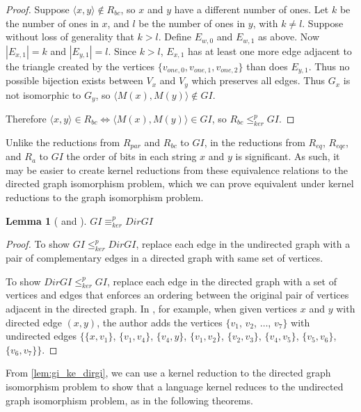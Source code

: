 \documentclass{article}
\newtheorem{lemma}[lemma]{Lemma}
\theoremstyle{definition} \newtheorem{definition}[definition]{Definition}
\newcommand{\kr}{\leq^{p}_{ker}} %
\newcommand{\kequiv}{\equiv^{p}_{ker}} %
\newcommand{\pair}[2]{\langle#1,#2\rangle} %
\begin{document}
\begin{proof}
  Suppose $\pair{x}{y}\notin R_{bc}$, so $x$ and $y$ have a different number of
  ones. Let $k$ be the number of ones in $x$, and $l$ be the number of ones in
  $y$, with $k\neq l$. Suppose without loss of generality that $k>l$. Define
  $E_{w,0}$ and $E_{w,1}$ as above. Now $|E_{x,1}|=k$ and $|E_{y,1}|=l$. Since
  $k>l$, $E_{x,1}$ has at least one more edge adjacent to the triangle created
  by the vertices $\{v_{one,0},v_{one,1},v_{one,2}\}$ than does $E_{y,1}$. Thus
  no possible bijection exists between $V_x$ and $V_y$ which preserves all
  edges. Thus $G_x$ is not isomorphic to $G_y$, so $\pair{M(x)}{M(y)}\notin
  GI$.

  Therefore $\pair{x}{y}\in R_{bc} \iff \pair{M(x)}{M(y)}\in GI$, so $R_{bc}\kr
  GI$.
\end{proof}

Unlike the reductions from $R_{par}$ and $R_{bc}$ to $GI$, in the reductions
from $R_{eq}$, $R_{eqc}$, and $R_a$ to $GI$ the order of bits in each string
$x$ and $y$ is significant. As such, it may be easier to create kernel
reductions from these equivalence relations to the directed graph isomorphism
problem, which we can prove equivalent under kernel reductions to the graph
isomorphism problem. 

\begin{lemma}[\cite{kst93} and \cite{miller77}]\label{lem:gi_ke_dirgi}
  $GI\kequiv DirGI$
\end{lemma}
\begin{proof}
  To show $GI\kr DirGI$, replace each edge in the undirected graph with a pair
  of complementary edges in a directed graph with same set of vertices.
  
  To show $DirGI\kr GI$, replace each edge in the directed graph with a set of
  vertices and edges that enforces an ordering between the original pair of
  vertices adjacent in the directed graph. In \cite{miller77}, for example,
  when given vertices $x$ and $y$ with directed edge $(x,y)$, the author adds
  the vertices $\{v_1$, $v_2$, $\ldots$, $v_7\}$ with undirected edges $\{\{x,
  v_1\}$, $\{v_1,v_4\}$, $\{v_4,y\}$, $\{v_1,v_2\}$, $\{v_2,v_3\}$,
  $\{v_4,v_5\}$, $\{v_5,v_6\}$, $\{v_6,v_7\}\}$.
\end{proof}

From \autoref{lem:gi_ke_dirgi}, we can use a kernel reduction to the directed
graph isomorphism problem to show that a language kernel reduces to the
undirected graph isomorphism problem, as in the following theorems.
\end{document}
